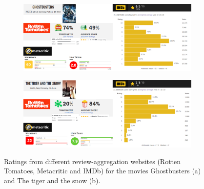 \begin{figure}
	\label{fig:movies}
	\centering
	\begin{subfigure}[b]{1\textwidth}
		\centering
		\includegraphics[scale=0.3]{img/ghost.png}
		\caption{}
	\end{subfigure}
	\begin{subfigure}[b]{1\textwidth}
		\centering
		\includegraphics[scale=0.3]{img/tigre.png}
		\caption{}
	\end{subfigure}
	\caption{Ratings from different review-aggregation websites (Rotten Tomatoes, Metacritic and IMDb) for the movies Ghostbusters (a) and The tiger and the snow (b).}
\end{figure}
